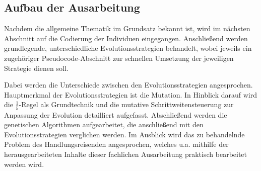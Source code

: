 \subsection{Aufbau der Ausarbeitung}

Nachdem die allgemeine Thematik im Grundsatz bekannt ist, wird im nächsten Abschnitt auf die Codierung der Individuen eingegangen. Anschließend werden grundlegende, unterschiedliche Evolutionsstrategien behandelt, wobei jeweils ein zugehöriger Pseudocode-Abschnitt zur schnellen Umsetzung der jeweiligen Strategie dienen soll.

Dabei werden die Unterschiede zwischen den Evolutionsstrategien angesprochen. Hauptmerkmal der Evolutionsstrategien ist die Mutation. In Hinblick darauf wird die $\frac{1}{5}$-Regel als Grundtechnik und die mutative Schrittweitensteuerung zur Anpassung der Evolution detailliert aufgefasst. Abschließend werden die genetischen Algorithmen aufgearbeitet, die anschließend mit den Evolutionsstrategien verglichen werden. Im Ausblick wird das zu behandelnde Problem des Handlungsreisenden angesprochen, welches u.a. mithilfe der herausgearbeiteten Inhalte dieser fachlichen Ausarbeitung praktisch bearbeitet werden wird.

